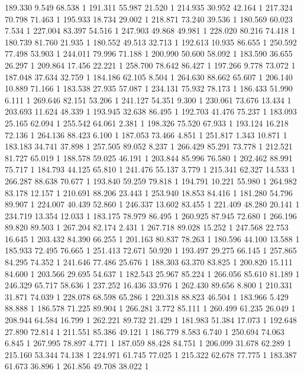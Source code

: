 	189.330	9.549	68.538	1
	191.311	55.987	21.520	1
	214.935	30.952	42.164	1
	217.324	70.798	71.463	1
	195.933	18.734	29.002	1
	218.871	73.240	39.536	1
	180.569	60.023	7.534	1
	227.004	83.397	54.516	1
	247.903	49.868	49.981	1
	228.020	80.216	74.418	1
	180.739	81.760	21.935	1
	180.552	49.513	32.713	1
	192.613	10.935	86.655	1
	250.592	77.498	53.903	1
	244.011	79.996	71.188	1
	200.990	50.600	58.092	1
	183.590	36.655	26.297	1
	209.864	17.456	22.221	1
	258.700	78.642	86.427	1
	197.266	9.778	73.072	1
	187.048	37.634	32.759	1
	184.186	62.105	8.504	1
	264.630	88.662	65.607	1
	206.140	10.889	71.166	1
	183.538	27.935	57.087	1
	234.131	75.932	78.173	1
	186.433	51.990	6.111	1
	269.646	82.151	53.206	1
	241.127	54.351	9.300	1
	230.061	73.676	13.434	1
	203.693	11.624	48.339	1
	193.945	32.638	86.495	1
	192.703	41.476	75.237	1
	183.093	25.165	62.094	1
	255.542	64.061	2.381	1
	198.326	75.520	67.933	1
	193.124	16.218	72.136	1
	264.136	88.423	6.100	1
	187.053	73.466	4.851	1
	251.817	1.343	10.871	1
	183.183	34.741	37.898	1
	257.505	89.052	8.237	1
	266.429	85.291	73.778	1
	212.521	81.727	65.019	1
	188.578	59.025	46.191	1
	203.844	85.996	76.580	1
	202.462	88.991	75.717	1
	184.793	44.125	65.810	1
	241.476	55.137	3.779	1
	215.341	62.327	14.533	1
	266.287	88.638	70.677	1
	193.840	59.259	79.818	1
	194.791	10.221	55.980	1
	264.982	83.178	12.157	1
	210.691	88.206	23.443	1
	253.940	18.853	84.416	1
	181.280	54.796	89.907	1
	224.007	40.439	52.860	1
	246.337	13.602	83.455	1
	221.409	48.280	20.141	1
	234.719	13.354	12.033	1
	183.175	78.979	86.495	1
	260.925	87.945	72.680	1
	266.196	89.820	89.503	1
	267.204	82.174	2.431	1
	267.718	89.028	15.252	1
	247.568	22.753	16.645	1
	203.432	84.390	66.255	1
	201.163	80.837	78.263	1
	180.596	44.100	13.588	1
	185.933	72.495	76.665	1
	251.413	72.671	50.920	1
	193.497	29.275	66.145	1
	257.865	84.295	74.352	1
	241.646	77.486	25.676	1
	188.303	63.370	83.825	1
	200.820	15.111	84.600	1
	203.566	29.695	54.637	1
	182.543	25.967	85.224	1
	266.056	85.610	81.189	1
	246.329	65.717	58.636	1
	237.252	16.436	33.976	1
	262.430	89.656	8.800	1
	210.331	31.871	74.039	1
	228.078	68.598	65.286	1
	220.318	88.823	46.504	1
	183.966	5.429	88.888	1
	186.578	71.225	89.904	1
	266.281	3.772	85.111	1
	260.499	61.235	26.049	1
	208.944	64.584	16.799	1
	262.221	89.732	21.429	1
	181.983	51.384	17.073	1
	192.648	27.890	72.814	1
	211.551	85.386	49.121	1
	186.779	8.583	6.740	1
	250.694	74.063	6.845	1
	267.995	78.897	4.771	1
	187.059	88.428	84.751	1
	206.099	31.678	62.289	1
	215.160	53.344	74.138	1
	224.971	61.745	77.025	1
	215.322	62.678	77.775	1
	183.387	61.673	36.896	1
	261.856	49.708	38.022	1
